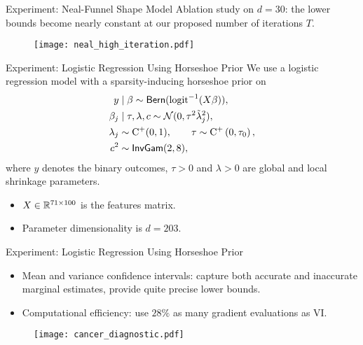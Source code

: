 \documentclass[10pt,xcolor=table]{beamer}
\begin{document}
\begin{frame}{Experiment: Neal-Funnel Shape Model}
Ablation study on $d=30$: the lower bounds become nearly constant at our proposed number of iterations $T$.
\begin{figure}
      \centering
      \texttt{[image: neal\_high\_iteration.pdf]}
\end{figure}
\end{frame}

\begin{frame}{Experiment: Logistic Regression Using Horseshoe Prior}
We use a logistic regression model with a sparsity-inducing horseshoe prior on 
\[
\begin{aligned}
    y &\mid \beta \sim {\sf{Bern}}(\operatorname{logit}^{-1}(X \beta)),\\
    \beta_{j} &\mid \tau, \lambda, c \sim \mathcal{N}(0, \tau^{2} \tilde{\lambda}_{j}^{2}), \\
    \lambda_{j} &\sim \mathrm{C}^{+}(0,1), \qquad \tau \sim \mathrm{C}^{+}\left(0, \tau_{0}\right), \\
    c^{2} &\sim {\sf{InvGam}}(2,8),
\end{aligned}
\]
where $y$ denotes the binary outcomes, $\tau >0 $ and $\lambda >0$ are global and local shrinkage parameters. 
\begin{itemize}
    \item $X \in \mathbb{R}^{71 \times 100}$ is the features matrix.
    \item Parameter dimensionality is $d = 203$.
\end{itemize}
\end{frame}

\begin{frame}{Experiment: Logistic Regression Using Horseshoe Prior}
\begin{itemize}
    \item Mean and variance confidence intervals: capture both accurate and inaccurate marginal estimates, provide quite precise lower bounds.
    \item Computational efficiency: use $28\%$ as many gradient evaluations as VI.
\end{itemize}
     \begin{figure}
      \centering
      \texttt{[image: cancer\_diagnostic.pdf]}
    \end{figure}
\end{frame}
\end{document}
